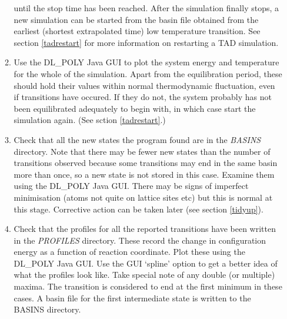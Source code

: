 \begin{enumerate}
\begin{enumerate}
  until the stop time has been reached. After the simulation finally stops,
  a new simulation can be started from the basin file obtained from
  the earliest (shortest extrapolated time) low temperature
  transition. See section \ref{tadrestart} for more information on
  restarting a TAD simulation.
\item Use the DL\_POLY Java GUI to plot the system energy and temperature
  for the whole of the simulation. Apart from the equilibration period,
  these should hold their values within normal thermodynamic fluctuation, 
  even if transitions have occured. If they do not, the system probably 
  has not been equilibrated adequately to begin with, in which case
  start the simulation again. (See sction \ref{tadrestart}.)
\item Check that all the new states the program found are in 
  the {\em BASINS} directory. Note that there may be fewer new states
  than the number of transitions observed because some transitions
  may end in the same basin more than once, so a new state is not
  stored in this case. Examine them using the DL\_POLY Java
  GUI. There may be signs of imperfect minimisation (atoms not quite on
  lattice sites etc) but this is normal at this stage. Corrective
  action can be taken later (see section \ref{tidyup}).
\item Check that the profiles for all the reported transitions have been
  written in the {\em PROFILES} directory. These record the change in
  configuration energy as a function of reaction coordinate.  Plot
  these using the DL\_POLY Java GUI. Use the GUI `spline' option to
  get a better idea of what the profiles look like. Take special note
  of any double (or multiple) maxima. The transition is considered to
  end at the first minimum in these cases. A basin file for the first
  intermediate state is written to the BASINS directory.
\end{enumerate}


\end{enumerate}
